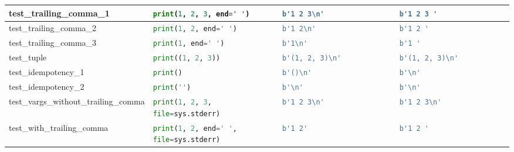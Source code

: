 \begin{table}[ht]
\begin{tabular}{|l|l|l|l|}
    test\_trailing\_comma\_1              & \lstinline[language=Python, style=pythonstyle]|print(1, 2, 3, end=' ')              | & \lstinline[language=Python, style=pythonstyle]|b'1 2 3\n'             | & \lstinline[language=Python, style=pythonstyle]|b'1 2 3 '                             | \\ \hline
    test\_trailing\_comma\_2              & \lstinline[language=Python, style=pythonstyle]|print(1, 2, end=' ')                 | & \lstinline[language=Python, style=pythonstyle]|b'1 2\n'               | & \lstinline[language=Python, style=pythonstyle]|b'1 2 '                               | \\ \hline
    test\_trailing\_comma\_3              & \lstinline[language=Python, style=pythonstyle]|print(1, end=' ')                    | & \lstinline[language=Python, style=pythonstyle]|b'1\n'                 | & \lstinline[language=Python, style=pythonstyle]|b'1 '                                 | \\ \hline
    test\_tuple                           & \lstinline[language=Python, style=pythonstyle]|print((1, 2, 3))                     | & \lstinline[language=Python, style=pythonstyle]|b'(1, 2, 3)\n'         | & \lstinline[language=Python, style=pythonstyle]|b'(1, 2, 3)\n'         | \\ \hline
    test\_idempotency\_1                  & \lstinline[language=Python, style=pythonstyle]|print()                              | & \lstinline[language=Python, style=pythonstyle]|b'()\n'                | & \lstinline[language=Python, style=pythonstyle]|b'\n'                  | \\ \hline
    test\_idempotency\_2                  & \lstinline[language=Python, style=pythonstyle]|print('')                            | & \lstinline[language=Python, style=pythonstyle]|b'\n'                  | & \lstinline[language=Python, style=pythonstyle]|b'\n'                  | \\ \hline
    test\_vargs\_without\_trailing\_comma & \lstinline[language=Python, style=pythonstyle]|print(1, 2, 3, file=sys.stderr)      | & \lstinline[language=Python, style=pythonstyle]|b'1 2 3\n'             | & \lstinline[language=Python, style=pythonstyle]|b'1 2 3\n'             | \\ \hline
    test\_with\_trailing\_comma           & \lstinline[language=Python, style=pythonstyle]|print(1, 2, end=' ', file=sys.stderr)| & \lstinline[language=Python, style=pythonstyle]|b'1 2'                                | & \lstinline[language=Python, style=pythonstyle]|b'1 2 '                               | \\ \hline

\end{tabular}
\end{table}
